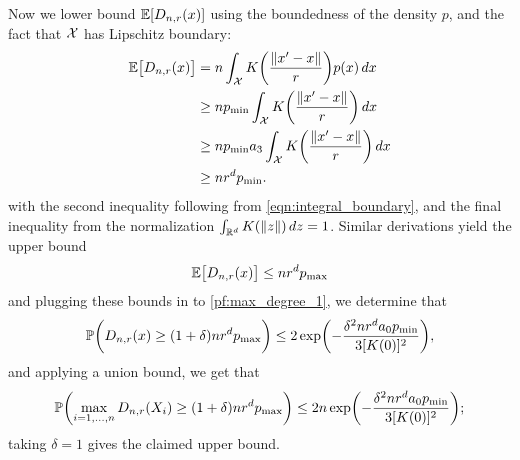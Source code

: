Now we lower bound $\mathbb{E}[D_{n,r}(x)]$ using the boundedness of the density $p$, and the fact that $\mathcal{X}$ has Lipschitz boundary:
\begin{align*}
\mathbb{E}\bigl[D_{n,r}(x)\bigr] & = n \int_{\mathcal{X}} K\biggl(\frac{\|x' - x\|}{r}\biggr) p(x) \,dx \\
& \geq n p_{\min} \int_{\mathcal{X}} K\biggl(\frac{\|x' - x\|}{r}\biggr) \,dx \\
& \geq n p_{\min} a_3 \int_{\mathcal{X}} K\biggl(\frac{\|x' - x\|}{r}\biggr) \,dx \\
& \geq nr^d p_{\min}.
\end{align*}
with the second inequality following from \eqref{eqn:integral_boundary}, and the final inequality from the normalization $\int_{\mathbb{R}^d} K(\|z\|) \,dz = 1$. Similar derivations yield the upper bound
\begin{equation*}
\mathbb{E}\bigl[D_{n,r}(x)\bigr] \leq nr^{d} p_{\max}
\end{equation*} 
and plugging these bounds in to \eqref{pf:max_degree_1}, we determine that
\begin{equation*}
\mathbb{P}\biggl(D_{n,r}(x) \geq (1 + \delta) nr^d p_{\max}\biggr) \leq 2\exp\biggl(-\frac{\delta^2nr^da_0p_{\min}}{3[K(0)]^2}\biggr),
\end{equation*}
and applying a union bound, we get that
\begin{equation*}
\mathbb{P}\biggl(\max_{i = 1,\ldots,n}D_{n,r}(X_i) \geq (1 + \delta) nr^d p_{\max}\biggr) \leq 2n\exp\biggl(-\frac{\delta^2nr^da_0p_{\min}}{3[K(0)]^2}\biggr);
\end{equation*}
taking $\delta = 1$ gives the claimed upper bound.

